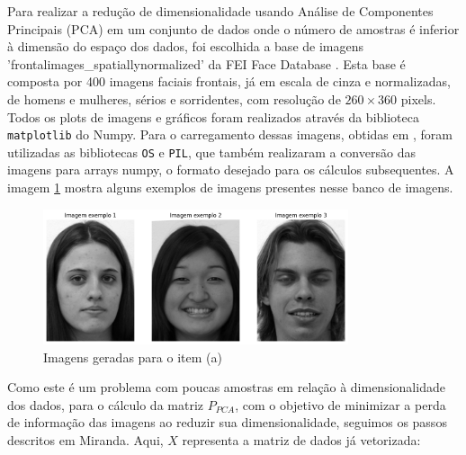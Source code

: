 \documentclass[a4paper, 11pt]{article}
\begin{document}
Para realizar a redução de dimensionalidade usando Análise de Componentes Principais (PCA) em um conjunto de dados onde o número de amostras é inferior à dimensão do espaço dos dados, foi escolhida a base de imagens 'frontalimages\_spatiallynormalized' da FEI Face Database \cite{FEI}. Esta base é composta por 400 imagens faciais frontais, já em escala de cinza e normalizadas, de homens e mulheres, sérios e sorridentes, com resolução de $260 \times 360$ pixels. Todos os plots de imagens e gráficos foram realizados através da biblioteca \texttt{matplotlib} do Numpy. Para o carregamento dessas imagens, obtidas em \cite{FEI}, foram utilizadas as bibliotecas \texttt{OS} e \texttt{PIL}, que também realizaram a conversão das imagens para arrays numpy, o formato desejado para os cálculos subsequentes. A imagem \ref{fig:FEI} mostra alguns exemplos de imagens presentes nesse banco de imagens.

\begin{figure}[H]
    \centering 
    \includegraphics[width=0.8\textwidth]{imgs/FEI.png}
    \caption{Imagens geradas para o item (a)}
    \label{fig:FEI} %
\end{figure}

Como este é um problema com poucas amostras em relação à dimensionalidade dos dados, para o cálculo da matriz $P_{PCA}$, com o objetivo de minimizar a perda de informação das imagens ao reduzir sua dimensionalidade, seguimos os passos descritos em Miranda. Aqui, $X$ representa a matriz de dados já vetorizada: 
\end{document}

